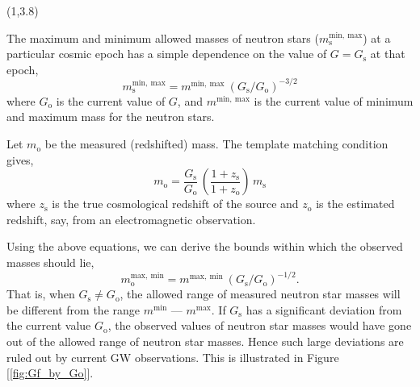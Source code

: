 \documentclass[a1,portrait]{a1poster}
\newcommand{\headingcolor}{\color{BannerElevenColor}}
\newcommand{\ms}{m_\mathrm{s}}
\newcommand{\mo}{m_\mathrm{o}}
\newcommand{\zs}{z_\mathrm{s}}
\newcommand{\zo}{z_\mathrm{o}}
\newcommand{\Gs}{G_\mathrm{s}}
\newcommand{\Go}{G_\mathrm{o}}
\def\LHead#1{\noindent{\LARGE \headingcolor #1}\smallskip}
\begin{document}


\begin{textblock}{7}(1,3.8)	%
\LHead{Background}

The maximum and minimum allowed masses of neutron stars ($\ms^\mathrm{min,~max}$) at a particular cosmic epoch has a simple dependence on the value of $G=\Gs$ at that epoch,
\begin{equation}
\ms^\mathrm{min,~max} = m^\mathrm{min,~max} ~ (\Gs/\Go)^{-3/2}
\label{eq:m_max_min}
\end{equation}
where $\Go$ is the current value of $ G $, and $m^\mathrm{min,~max}$ is the current value of minimum and maximum mass for the neutron stars.

Let $ \mo $ be the measured (redshifted) mass. The template matching condition gives,
\begin{equation}
\mo = \frac{\Gs}{\Go} \, \left(\frac{1+\zs}{1+\zo}\right) \, \ms
\label{eq:m_obs_with_z}
\end{equation}
where $\zs$ is the true cosmological redshift of the source and $\zo$ is the estimated redshift, say, from an electromagnetic observation.

Using the above equations, we can derive the bounds within which the observed masses should lie,
\begin{equation}
\mo^\mathrm{max,~min} = m^\mathrm{max,~min}~(\Gs/\Go)^{-1/2}. 
\label{eq:m_obs_fn_Gf}
\end{equation}
That is, when $\Gs \neq \Go$, the allowed range of measured neutron star masses will be different from the range $m^\mathrm{min}$ --- $m^\mathrm{max}$. If $\Gs$ has a significant deviation from the current value $\Go$, the observed values of neutron star masses  would have gone out of the allowed range of neutron star masses. Hence such large deviations are ruled out by current GW observations. This is illustrated in Figure [\ref{fig:Gf_by_Go}].


\end{textblock}
\end{document}

